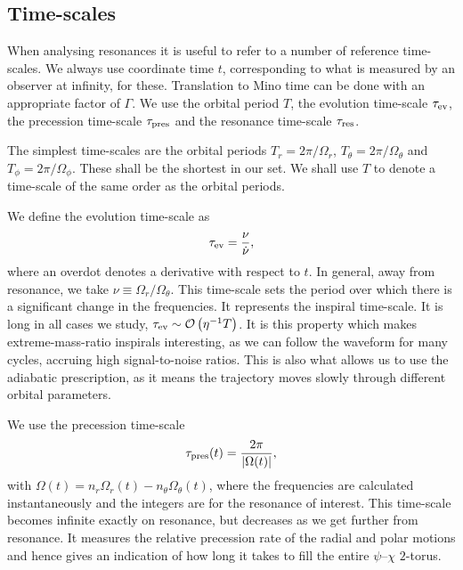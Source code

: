 \subsection{Time-scales}\label{sec:res-time}

When analysing resonances it is useful to refer to a number of reference time-scales. We always use coordinate time $t$, corresponding to what is measured by an observer at infinity, for these. Translation to Mino time can be done with an appropriate factor of $\Gamma$. We use the orbital period $T$, the evolution time-scale $\tau_\mathrm{ev}$, the precession time-scale $\tau_\mathrm{pres}$ and the resonance time-scale $\tau_\mathrm{res}$.

The simplest time-scales are the orbital periods $T_r = 2\pi/\Omega_r$, $T_\theta = 2\pi/\Omega_\theta$ and $T_\phi = 2\pi/\Omega_\phi$. These shall be the shortest in our set. We shall use $T$ to denote a time-scale of the same order as the orbital periods.

We define the evolution time-scale as
\begin{equation}
\tau_\mathrm{ev} = \dfrac{\nu}{\dot{\nu}},
\end{equation}
where an overdot denotes a derivative with respect to $t$. In general, away from resonance, we take $\nu \equiv \Omega_r/\Omega_\theta$. This time-scale sets the period over which there is a significant change in the frequencies. It represents the inspiral time-scale. It is long in all cases we study, $\tau_\mathrm{ev} \sim \mathcal{O}\left({\eta^{-1}T}\right)$. It is this property which makes extreme-mass-ratio inspirals interesting, as we can follow the waveform for many cycles, accruing high signal-to-noise ratios. This is also what allows us to use the adiabatic prescription, as it means the trajectory moves slowly through different orbital parameters.

We use the precession time-scale
\begin{equation}
\tau_\mathrm{pres}(t) = \dfrac{2\pi}{|\Omega(t)|},
\label{eq:t-pres}
\end{equation}
with $\Omega(t) = n_r \Omega_r(t) - n_\theta \Omega_\theta(t)$, where the frequencies are calculated instantaneously and the integers are for the resonance of interest. This time-scale becomes infinite exactly on resonance, but decreases as we get further from resonance. It measures the relative precession rate of the radial and polar motions and hence gives an indication of how long it takes to fill the entire $\psi$--$\chi$ $2$-torus.

